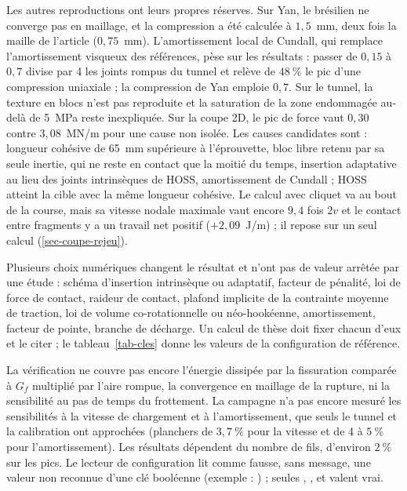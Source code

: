 Les autres reproductions ont leurs propres réserves. Sur Yan, le brésilien ne converge pas en maillage, et la compression a été calculée à $1{,}5$~mm, deux fois la maille de l'article ($0{,}75$~mm). L'amortissement local de Cundall, qui remplace l'amortissement visqueux des références, pèse sur les résultats : passer de $0{,}15$ à $0{,}7$ divise par 4 les joints rompus du tunnel et relève de $48~\%$ le pic d'une compression uniaxiale ; la compression de Yan emploie $0{,}7$. Sur le tunnel, la texture en blocs n'est pas reproduite et la saturation de la zone endommagée au-delà de 5~MPa reste inexpliquée. Sur la coupe 2D, le pic de force vaut $0{,}30$ contre $3{,}08$~MN/m pour une cause non isolée. Les causes candidates sont : longueur cohésive de 65~mm supérieure à l'éprouvette, bloc libre retenu par sa seule inertie, qui ne reste en contact que la moitié du temps, insertion adaptative au lieu des joints intrinsèques de HOSS, amortissement de Cundall ; HOSS atteint la cible avec la même longueur cohésive. Le calcul avec cliquet va au bout de la course, mais sa vitesse nodale maximale vaut encore $9{,}4$ fois $2v$ et le contact entre fragments y a un travail net positif ($+2{,}09$~J/m) ; il repose sur un seul calcul (\cref{sec-coupe-rejeu}).

Plusieurs choix numériques changent le résultat et n'ont pas de valeur arrêtée par une étude : schéma d'insertion intrinsèque ou adaptatif, facteur de pénalité, loi de force de contact, raideur de contact, plafond implicite de la contrainte moyenne de traction, loi de volume co-rotationnelle ou néo-hookéenne, amortissement, facteur de pointe, branche de décharge. Un calcul de thèse doit fixer chacun d'eux et le citer ; le tableau~\ref{tab-cles} donne les valeurs de la configuration de référence.

La vérification ne couvre pas encore l'énergie dissipée par la fissuration comparée à $G_f$ multiplié par l'aire rompue, la convergence en maillage de la rupture, ni la sensibilité au pas de temps du frottement. La campagne n'a pas encore mesuré les sensibilités à la vitesse de chargement et à l'amortissement, que seuls le tunnel et la calibration ont approchées (planchers de $3{,}7~\%$ pour la vitesse et de 4 à $5~\%$ pour l'amortissement). Les résultats dépendent du nombre de fils, d'environ $2~\%$ sur les pics. Le lecteur de configuration lit comme fausse, sans message, une valeur non reconnue d'une clé booléenne (exemple : ) ; seules , ,  et  valent vrai.

